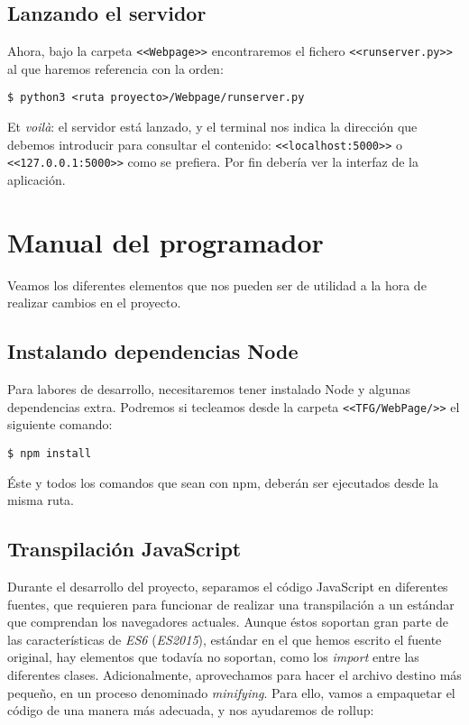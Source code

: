 \subsection{Lanzando el servidor}
Ahora, bajo la carpeta \texttt{<<Webpage>>} encontraremos el fichero \texttt{<<runserver.py>>} al que haremos referencia con la orden:

\noindent\verb|$ python3 <ruta proyecto>/Webpage/runserver.py|

Et \textit{voilà}: el servidor está lanzado, y el terminal nos indica la dirección que debemos introducir para consultar el contenido: \texttt{<<localhost:5000>>} o \texttt{<<127.0.0.1:5000>>} como se prefiera. Por fin debería ver la interfaz de la aplicación.



\section{Manual del programador}\label{manual-programador}
Veamos los diferentes elementos que nos pueden ser de utilidad a la hora de realizar cambios en el proyecto.

\subsection{Instalando dependencias Node}
Para labores de desarrollo, necesitaremos tener instalado Node y algunas dependencias extra. Podremos si tecleamos desde la carpeta \texttt{<<TFG/WebPage/>>} el siguiente comando:

\noindent\verb|$ npm install|

Éste y todos los comandos que sean con npm, deberán ser ejecutados desde la misma ruta.

\subsection{Transpilación JavaScript}
Durante el desarrollo del proyecto, separamos el código JavaScript en diferentes fuentes, que requieren para funcionar de realizar una transpilación a un estándar que comprendan los navegadores actuales. Aunque éstos soportan gran parte de las características de \textit{ES6} (\textit{ES2015}), estándar en el que hemos escrito el fuente original, hay elementos que todavía no soportan, como los \textit{import} entre las diferentes clases. Adicionalmente, aprovechamos para hacer el archivo destino más pequeño, en un proceso denominado \textit{minifying}.
Para ello, vamos a empaquetar el código de una manera más adecuada, y nos ayudaremos de rollup:


